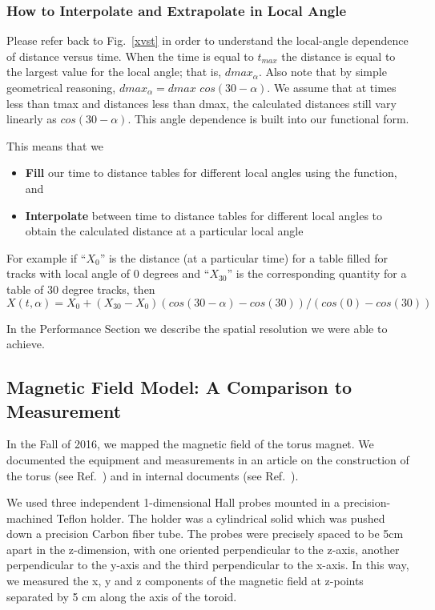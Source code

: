 \subsubsection{How to Interpolate and Extrapolate in Local Angle}
Please refer back to Fig.~\ref{xvst} in order to understand the local-angle dependence
of distance versus time.  When the time is equal to $t_{max}$ the distance is equal to
the largest value for the local angle; that is, $dmax_{\alpha}$.  Also note that by
simple geometrical reasoning, $dmax_{\alpha} = dmax$  $cos(30-\alpha)$.
We assume that at times less than tmax and distances less than dmax, the calculated
distances still vary linearly as $cos(30-\alpha)$.  This angle dependence is built into
our functional form.

This means that we
\begin{itemize}
\item {\bf Fill} our time to distance tables for different local angles using the function, and
\item {\bf Interpolate} between time to distance tables for different local angles to obtain
the calculated distance at a particular local angle
\end{itemize}
For example if ``$X_0$'' is the distance (at a particular time) for a table filled for tracks with local angle of 0 degrees
and ``$X_{30}$'' is the corresponding quantity for a table of 30 degree tracks, then
\begin{equation} 
\label{eq-extrap30}
X(t,\alpha) = X_0 + (X_{30}-X_0) (cos(30-\alpha) - cos(30)) / (cos(0) - cos(30))
\end{equation}

In the Performance Section we describe the spatial resolution we were able to achieve.

\subsection{Magnetic Field Model: A Comparison to Measurement}
In the Fall of 2016, we mapped the magnetic field of the torus magnet.
We documented the equipment and measurements in an article on the
construction of the torus (see Ref.~\cite{torus-ieee}) and in internal
documents (see Ref.~\cite{magmapping}).

We used three independent 1-dimensional Hall probes mounted in a precision-machined
Teflon holder.  The holder was a cylindrical solid which was pushed down a precision
Carbon fiber tube.  The probes were precisely spaced to be 5cm apart in the z-dimension,
with one oriented perpendicular to the z-axis, another perpendicular to the y-axis and
the third perpendicular to the x-axis.  In this way, we measured the x, y and z components
of the magnetic field at z-points separated by 5 cm along the axis of the toroid.

